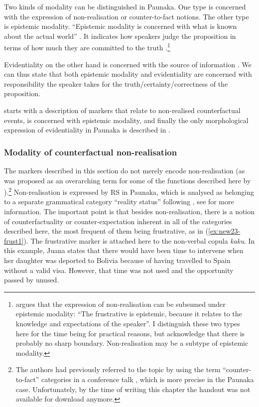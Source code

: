 Two kinds of modality can be distinguished in Paunaka. One type is concerned with the expression of non-realisation or counter-to-fact notions. The other type is epistemic modality. “Epistemic modality is concerned with what is known about the actual world” \citep[1193]{Hengeveld2004}. It indicates how speakers judge the proposition in terms of how much they are committed to the truth \citep[8]{Palmer2001}.\footnote{\citet[481]{Overall2017} argues that the expression of non-realisation can be subsumed under epistemic modality: “The frustrative is epistemic, because it relates to the knowledge and expectations of the speaker”. I distinguish these two types here for the time being for practical reasons, but acknowledge that there is probably no sharp boundary. Non-realisation may be a subtype of epistemic modality.} 

Evidentiality on the other hand is concerned with the source of information \citep[3]{Aikhenvald2004}. We can thus state that both epistemic modality and evidentiality are concerned with responsibility the speaker takes for the truth/certainty/correctness of the proposition.

 starts with a description of markers that relate to non-realised counterfactual events,  is concerned with epistemic modality, and finally the only morphological expression of evidentiality in Paunaka is described in .


\subsubsection{Modality of counterfactual non-realisation}\label{sec:Frust_avertive_optatiev}

The markers described in this section do not merely encode non-realisation (as was proposed as an overarching term for some of the functions described here by \citealt[]{Kuteva2019}).\footnote{The authors had previously referred to the topic by using the term “counter-to-fact” categories in a conference talk \citep[]{Kuteva_et_al2015}, which is more precise in the Paunaka case. Unfortunately, by the time of writing this chapter the handout was not available for download anymore.} Non-realisation is expressed by  RS in Paunaka, which is analysed as belonging to a separate grammatical category “reality status” following \citet[]{Elliott2000}, see  for more information. The important point is that besides non-realisation, there is a notion of counterfactuality or counter-expectation inherent in all of the categories described here, the most frequent of them being frustrative, as in (\ref{ex:new23-frust1}). The frustrative marker is attached here to the non-verbal copula \textit{kaku}. In this example, Juana states that there would have been time to intervene when her daughter was deported to Bolivia because of having travelled to Spain without a valid visa. However, that time was not used and the opportunity passed by unused.


